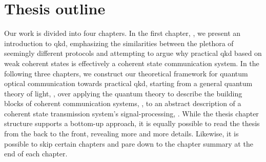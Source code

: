 
\section*{Thesis outline}

Our work is divided into four chapters.
In the first chapter, , we present an introduction to \gls{qkd}, emphasizing the similarities between the plethora of seemingly different protocols and attempting to argue why practical \gls{qkd} based on weak coherent states is effectively a coherent state communication system.
In the following three chapters, we construct our theoretical framework for quantum optical communication towards practical \gls{qkd}, starting from a general quantum theory of light, , over applying the quantum theory to describe the building blocks of coherent communication systems, , to an abstract description of a coherent state transmission system's signal-processing, .
While the thesis chapter structure supports a bottom-up approach, it is equally possible to read the thesis from the back to the front, revealing more and more details.
Likewise, it is possible to skip certain chapters and pare down to the chapter summary at the end of each chapter.
